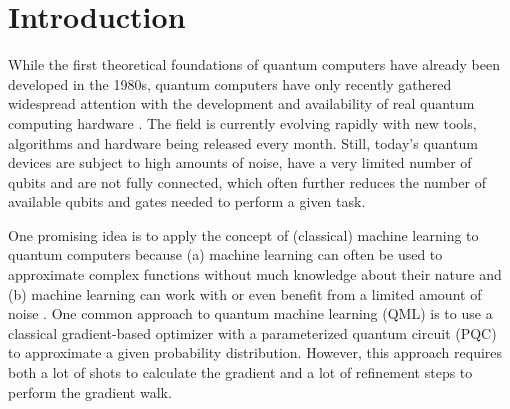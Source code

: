\chapter{Introduction}
\label{chap:intro}


While the first theoretical foundations of quantum computers have already been
developed in the 1980s, quantum computers have only recently gathered widespread
attention with the development and availability of real quantum computing
hardware \cite{nielsen_quantum_2007,hidary_quantum_2021}.
The field is currently evolving rapidly with new tools, algorithms and hardware
being released every month. %
Still, today's quantum devices are subject to high amounts of noise, have a very
limited number of qubits and are not fully connected, which often further
reduces the number of available qubits and gates needed to perform a given task.

One promising idea is to apply the concept of (classical) machine learning to
quantum computers because (a) machine learning can often be used to approximate
complex functions without much knowledge about their nature and
(b) machine learning can work with or even benefit from a limited amount of
noise \cite{ciliberto_quantum_2018}.
One common approach to quantum machine learning (QML) is to use a classical
gradient-based optimizer with a parameterized quantum circuit (PQC) to
approximate a given probability distribution.
However, this approach requires both a lot of shots to calculate the gradient
and a lot of refinement steps to perform the gradient walk.

